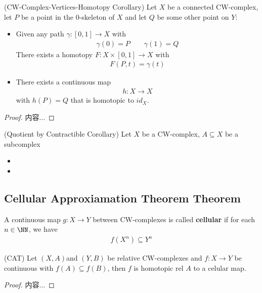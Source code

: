 \documentclass[Total.tex]{subfiles}
\begin{document}
	\begin{corollary}
		(CW-Complex-Vertices-Homotopy Corollary) Let $X$ be a connected CW-complex, let $P$ be a point in the $0$-skeleton of $X$ and let $Q$ be some other point on $Y$:
		\begin{itemize}
			\item Given any path $\gamma:[0,1]\rightarrow X$ with
			\begin{gather*}
				\gamma(0)=P\qquad \gamma(1)=Q
			\end{gather*}
			There exists a homotopy $F:X\times [0,1]\rightarrow X$ with
			\begin{gather*}
				F(P,t)=\gamma(t)
			\end{gather*}
			\item There exists a continuous map
			\begin{gather*}
				h:X \rightarrow X
			\end{gather*}
			with $h(P)=Q$ that is homotopic to $id_X$.
		\end{itemize}
	\end{corollary}
	\begin{proof}
		内容...
	\end{proof}
	
	\begin{corollary}
		(Quotient by Contractible Corollary) Let $X$ be a CW-complex, $A\subseteq X$ be a subcomplex
		\begin{itemize}
			\item 
			\item 
		\end{itemize}
	\end{corollary}
	\subsection{Cellular Approxiamation Theorem Theorem}
	\begin{Def}
		A continuous map $g:X\rightarrow Y$ between CW-complexes is called \textbf{cellular} if for each $n\in \NN$, we have
		\begin{gather*}
			f(X^n)\subseteq Y^n
		\end{gather*}
	\end{Def}
	
	\begin{theorem}
		(CAT) Let $(X,A)$and $(Y,B)$ be relative CW-complexes and $f:X\rightarrow Y$ be continuous with $f(A)\subseteq f(B)$, then $f$ is homotopic rel $A$ 
		to a celular map.
	\end{theorem}
	\begin{proof}
		内容...
	\end{proof}
\end{document}

